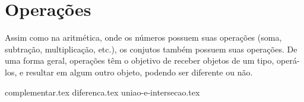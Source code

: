 \section{Operações}
\label{sec:op}
Assim como na aritmética, onde os números possuem suas operações (soma, subtração,  multiplicação, etc.), os conjutos também possuem suas operações.
De uma forma geral, operações têm o objetivo de receber objetos de um tipo, operá-los, e resultar em algum outro objeto, podendo ser diferente ou não.

{complementar.tex}
{diferenca.tex}
{uniao-e-intersecao.tex}

